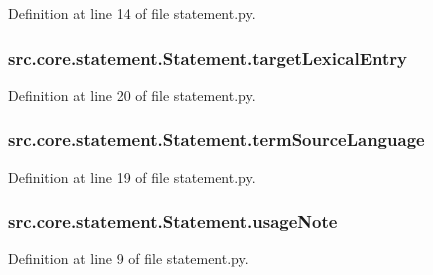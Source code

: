 Definition at line 14 of file statement.\+py.

\hypertarget{classsrc_1_1core_1_1statement_1_1_statement_a8ff06170be6b1b8856c0b2c78c458dac}{
\subsubsection[{target\+Lexical\+Entry}]{\setlength{\rightskip}{0pt plus 5cm}src.\+core.\+statement.\+Statement.\+target\+Lexical\+Entry}}\label{classsrc_1_1core_1_1statement_1_1_statement_a8ff06170be6b1b8856c0b2c78c458dac}


Definition at line 20 of file statement.\+py.

\hypertarget{classsrc_1_1core_1_1statement_1_1_statement_ab1bd16d721a81ebae7f1e0fb5da23d0f}{
\subsubsection[{term\+Source\+Language}]{\setlength{\rightskip}{0pt plus 5cm}src.\+core.\+statement.\+Statement.\+term\+Source\+Language}}\label{classsrc_1_1core_1_1statement_1_1_statement_ab1bd16d721a81ebae7f1e0fb5da23d0f}


Definition at line 19 of file statement.\+py.

\hypertarget{classsrc_1_1core_1_1statement_1_1_statement_afbcca36f7315bd8b556f31a6c73da2e8}{
\subsubsection[{usage\+Note}]{\setlength{\rightskip}{0pt plus 5cm}src.\+core.\+statement.\+Statement.\+usage\+Note}}\label{classsrc_1_1core_1_1statement_1_1_statement_afbcca36f7315bd8b556f31a6c73da2e8}


Definition at line 9 of file statement.\+py.

